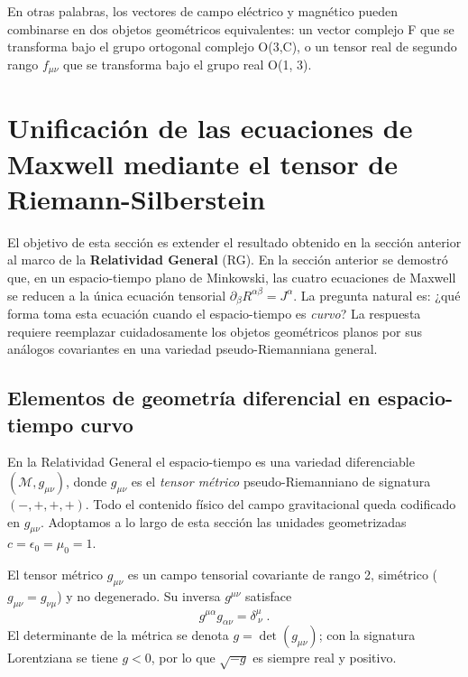         En otras palabras, los vectores de campo eléctrico y magnético pueden combinarse en dos objetos geométricos equivalentes: un vector complejo F que se transforma bajo el grupo ortogonal complejo O(3,C), o un tensor real de segundo rango $f_{\mu\nu}$ que se transforma bajo el grupo real O(1, 3).
    
    \section{Unificación de las ecuaciones de Maxwell mediante el tensor de Riemann-Silberstein}
        
        El objetivo de esta sección es extender el resultado obtenido en la sección anterior al marco de la \textbf{Relatividad General} (RG). En la sección anterior se demostró que, en un espacio-tiempo plano de Minkowski, las cuatro ecuaciones de Maxwell se reducen a la única ecuación tensorial $\partial_{\beta}R^{\alpha\beta} = J^{\alpha}$. La pregunta natural es: ¿qué forma toma esta ecuación cuando el espacio-tiempo es \emph{curvo}? La respuesta requiere reemplazar cuidadosamente los objetos geométricos planos por sus análogos covariantes en una variedad pseudo-Riemanniana general.

        \subsection{Elementos de geometría diferencial en espacio-tiempo curvo}\label{subsec:GeomDif}

            En la Relatividad General el espacio-tiempo es una variedad diferenciable $(\mathcal{M}, g_{\mu\nu})$, donde $g_{\mu\nu}$ es el \emph{tensor métrico} pseudo-Riemanniano de signatura $(-,+,+,+)$.  Todo el contenido físico del campo gravitacional queda codificado en $g_{\mu\nu}$.  Adoptamos a lo largo de esta sección las unidades geometrizadas $c = \epsilon_0 = \mu_0 = 1$.

            \begin{myDef}
                El tensor métrico $g_{\mu\nu}$ es un campo tensorial covariante de rango 2, simétrico ($g_{\mu\nu}=g_{\nu\mu}$) y no degenerado.  Su inversa
                $g^{\mu\nu}$ satisface
                \begin{equation}
                    g^{\mu\alpha}g_{\alpha\nu} = \delta^{\mu}_{\ \nu}\;.
                \end{equation}
                El determinante de la métrica se denota $g = \det(g_{\mu\nu})$; con la signatura Lorentziana se tiene $g < 0$, por lo que $\sqrt{-g}$ es siempre real y positivo.
            \end{myDef}

